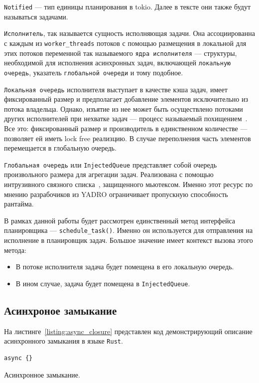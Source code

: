 \verb|Notified| --- тип единицы планирования в tokio. Далее в тексте они также будут называться задачами.

\verb|Исполнитель|, так называется сущность исполняющая задачи. Она ассоциированна с каждым из \verb|worker_threads| потоков с помощью размещения в локальной для этих потоков переменной так называемого \verb|ядра исполнителя| --- структуры, необходимой для исполнения асинхронных задач, включающей \verb|локальную очередь|, указатель \verb|глобальной очереди| и тому подобное.

\verb|Локальная очередь| исполнителя выступает в качестве кэша задач, имеет фиксированный размер и предполагает добавление элементов  исключительно из потока владельца. Однако, изъятие из нее может быть осуществлено потоками других исполнителей при нехватке задач --- процесс называемый похищением~\cite{cringeTokioIOUring}. Все это: фиксированный размер и производитель в единственном количестве --- позволяет ей иметь lock free реализцию. В случае переполнения часть элементов перемещается в глобальную очередь.

\verb|Глобальная очередь| или \verb|InjectedQueue| представляет собой очередь произвольного размера для агрегации задач. Реализована с помощью интрузивного связного списка~\cite{queues}, защищенного мьютексом. Именно этот ресурс по мнению разрабочиков из YADRO ограничивает пропускную способность рантайма.

В рамках данной работы будет рассмотрен единственный метод интерфейса планировщика --- \verb|schedule_task()|. Именно он используется для отправления на исполнение в планировщик задач. Большое значение имеет контекст вызова этого метода:

\begin{itemize}
    \item В потоке исполнителя задача будет помещена в его локальную очередь.
    \item В ином случае, задача будет помещена в \verb|InjectedQueue|.
\end{itemize}

\subsection{Асинхроное замыкание}

На листинге~\ref{listing:async_closure} представлен код демонстрирующий описание асинхронного замыкания в языке \verb|Rust|.

\begin{listing}[H]
    \begin{verbatim}
async {}
    \end{verbatim}

    \caption{Асинхронное замыкание.}
    \label{listing:async_closure}
\end{listing}


